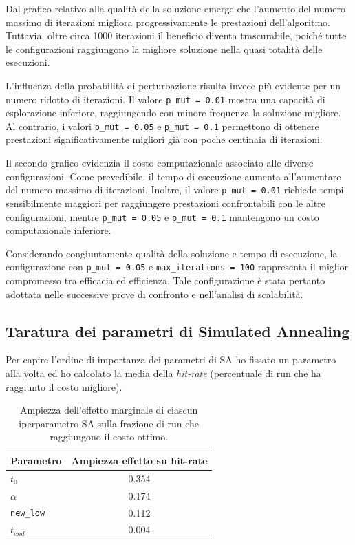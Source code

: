\documentclass[11pt,a4paper]{article}
\begin{document}
Dal grafico relativo alla qualità della soluzione emerge che l'aumento del numero massimo di iterazioni migliora progressivamente le prestazioni dell'algoritmo. Tuttavia, oltre circa 1000 iterazioni il beneficio diventa trascurabile, poiché tutte le configurazioni raggiungono la migliore soluzione nella quasi totalità delle esecuzioni.

L'influenza della probabilità di perturbazione risulta invece più evidente per un numero ridotto di iterazioni. Il valore \texttt{p\_mut = 0.01} mostra una capacità di esplorazione inferiore, raggiungendo con minore frequenza la soluzione migliore. Al contrario, i valori \texttt{p\_mut = 0.05} e \texttt{p\_mut = 0.1} permettono di ottenere prestazioni significativamente migliori già con poche centinaia di iterazioni.

Il secondo grafico evidenzia il costo computazionale associato alle diverse configurazioni. Come prevedibile, il tempo di esecuzione aumenta all'aumentare del numero massimo di iterazioni. Inoltre, il valore \texttt{p\_mut = 0.01} richiede tempi sensibilmente maggiori per raggiungere prestazioni confrontabili con le altre configurazioni, mentre \texttt{p\_mut = 0.05} e \texttt{p\_mut = 0.1} mantengono un costo computazionale inferiore.

Considerando congiuntamente qualità della soluzione e tempo di esecuzione, la configurazione con \texttt{p\_mut = 0.05} e \texttt{max\_iterations = 100} rappresenta il miglior compromesso tra efficacia ed efficienza. Tale configurazione è stata pertanto adottata nelle successive prove di confronto e nell'analisi di scalabilità.


\subsection{Taratura dei parametri di Simulated Annealing}
\label{sec:sa-sensitivity}

Per capire l'ordine di importanza dei parametri di SA ho fissato un parametro alla volta ed ho calcolato la media della \emph{hit-rate} (percentuale di run che ha raggiunto il costo migliore).

\begin{table}[H]
\centering
\begin{tabular}{@{}lc@{}}
\toprule
\textbf{Parametro} & \textbf{Ampiezza effetto su hit-rate} \\
\midrule
$t_0$        & 0.354 \\
$\alpha$     & 0.174 \\
\texttt{new\_low} & 0.112 \\
$t_{end}$    & 0.004 \\
\bottomrule
\end{tabular}
\caption{Ampiezza dell'effetto marginale di ciascun iperparametro SA sulla frazione di run che raggiungono il costo ottimo.}
\label{tab:sa-importance}
\end{table}
\end{document}
